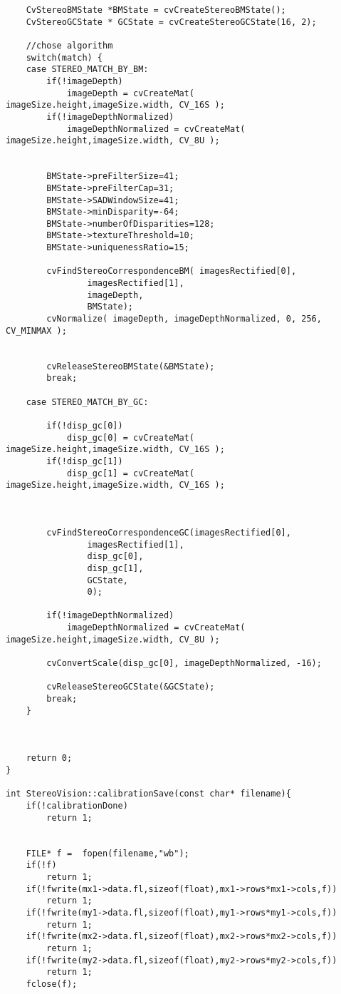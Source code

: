 \begin{lstlisting}
    CvStereoBMState *BMState = cvCreateStereoBMState();
    CvStereoGCState * GCState = cvCreateStereoGCState(16, 2);

    //chose algorithm
    switch(match) {
    case STEREO_MATCH_BY_BM:
    	if(!imageDepth)
   	    	imageDepth = cvCreateMat( imageSize.height,imageSize.width, CV_16S );
  	    if(!imageDepthNormalized)
   	    	imageDepthNormalized = cvCreateMat( imageSize.height,imageSize.width, CV_8U );


    	BMState->preFilterSize=41;
    	BMState->preFilterCap=31;
    	BMState->SADWindowSize=41;
    	BMState->minDisparity=-64;
    	BMState->numberOfDisparities=128;
    	BMState->textureThreshold=10;
    	BMState->uniquenessRatio=15;

    	cvFindStereoCorrespondenceBM( imagesRectified[0],
    			imagesRectified[1],
    			imageDepth,
    			BMState);
    	cvNormalize( imageDepth, imageDepthNormalized, 0, 256, CV_MINMAX );


    	cvReleaseStereoBMState(&BMState);
    	break;

    case STEREO_MATCH_BY_GC:

    	if(!disp_gc[0])
   	    	disp_gc[0] = cvCreateMat( imageSize.height,imageSize.width, CV_16S );
  	    if(!disp_gc[1])
   	    	disp_gc[1] = cvCreateMat( imageSize.height,imageSize.width, CV_16S );



  	    cvFindStereoCorrespondenceGC(imagesRectified[0],
  	    		imagesRectified[1],
  	    		disp_gc[0],
  	    		disp_gc[1],
  	    		GCState,
  	    		0);

  	    if(!imageDepthNormalized)
  	       	imageDepthNormalized = cvCreateMat( imageSize.height,imageSize.width, CV_8U );

        cvConvertScale(disp_gc[0], imageDepthNormalized, -16);

  	    cvReleaseStereoGCState(&GCState);
  	    break;
    }



    return 0;
}

int StereoVision::calibrationSave(const char* filename){
    if(!calibrationDone)
    	return 1;


    FILE* f =  fopen(filename,"wb");
    if(!f)
    	return 1;
    if(!fwrite(mx1->data.fl,sizeof(float),mx1->rows*mx1->cols,f))
    	return 1;
    if(!fwrite(my1->data.fl,sizeof(float),my1->rows*my1->cols,f))
    	return 1;
    if(!fwrite(mx2->data.fl,sizeof(float),mx2->rows*mx2->cols,f))
    	return 1;
    if(!fwrite(my2->data.fl,sizeof(float),my2->rows*my2->cols,f))
    	return 1;
    fclose(f);



\end{lstlisting}
